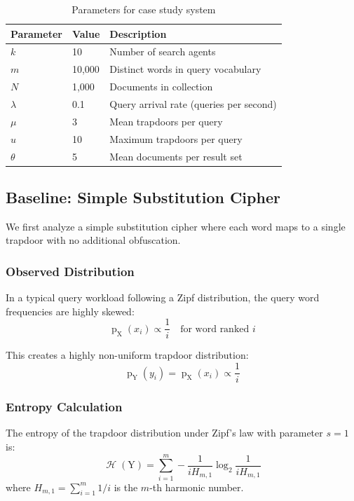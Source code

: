 \documentclass[final,11pt]{article}
\newcommand{\rv}[1]{\mathrm{#1}}
\newcommand{\entropy}{\operatorname{\mathcal{H}}}
\newcommand{\pmf}{\operatorname{p}}
\numberwithin{equation}{section}
\theoremstyle{plain}
\theoremstyle{remark}
\begin{document}
\begin{table}[h]
    \centering
    \caption{Parameters for case study system}
    \label{tbl:case_study_params}
    \begin{tabular}{@{} l l l @{}}
        \toprule
        \textbf{Parameter} & \textbf{Value} & \textbf{Description}\\
        \midrule
        $k$ & 10 & Number of search agents\\
        $m$ & 10,000 & Distinct words in query vocabulary\\
        $N$ & 1,000 & Documents in collection\\
        $\lambda$ & 0.1 & Query arrival rate (queries per second)\\
        $\mu$ & 3 & Mean trapdoors per query\\
        $u$ & 10 & Maximum trapdoors per query\\
        $\theta$ & 5 & Mean documents per result set\\
        \bottomrule
    \end{tabular}
\end{table}

\subsection{Baseline: Simple Substitution Cipher}
We first analyze a simple substitution cipher where each word maps to a single trapdoor with no additional obfuscation.

\subsubsection{Observed Distribution}
In a typical query workload following a Zipf distribution, the query word frequencies are highly skewed:
\begin{equation}
    \pmf_{\rv{X}}(x_i) \propto \frac{1}{i} \quad \text{for word ranked } i
\end{equation}

This creates a highly non-uniform trapdoor distribution:
\begin{equation}
    \pmf_{\rv{Y}}(y_i) = \pmf_{\rv{X}}(x_i) \propto \frac{1}{i}
\end{equation}

\subsubsection{Entropy Calculation}
The entropy of the trapdoor distribution under Zipf's law with parameter $s=1$ is:
\begin{equation}
    \entropy(\rv{Y}) = \sum_{i=1}^{m} -\frac{1}{i H_{m,1}} \log_2 \frac{1}{i H_{m,1}}
\end{equation}
where $H_{m,1} = \sum_{i=1}^{m} 1/i$ is the $m$-th harmonic number.
\end{document}
